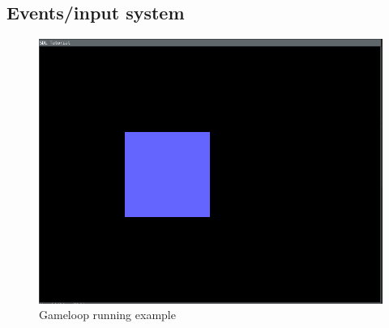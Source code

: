 \documentclass{projdoc}
\begin{document}
\subsection{Events/input system}
\label{poc:event}

\begin{figure}
	\centering
	\includegraphics[scale=0.4]{img/poc-button.png}
	\caption{Gameloop running example}
	\label{fig:poc-event}
\end{figure}
\end{document}
